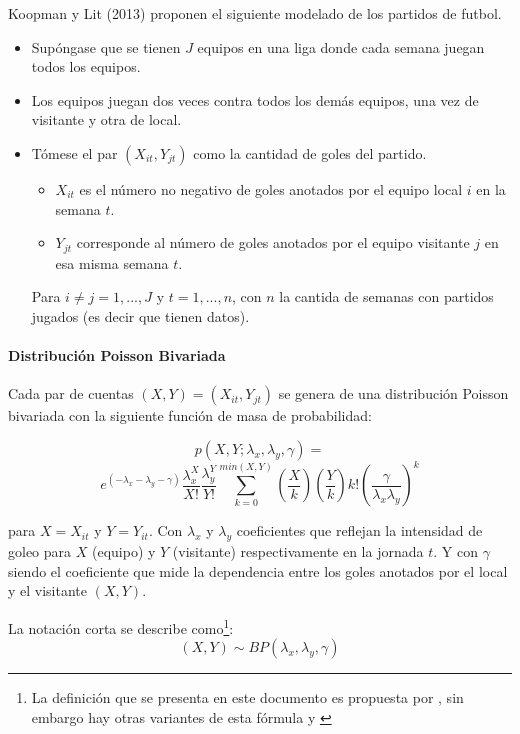 Koopman y Lit (2013) \cite{koopman2013dynamic} proponen el siguiente modelado de los partidos de futbol.
\begin{itemize}

	\item Supóngase que se tienen $J$ equipos en una liga donde cada semana juegan todos los equipos.

	\item Los equipos juegan dos veces contra todos los demás equipos, una vez de visitante y otra de local.
	\item Tómese el par $(X_{it},Y_{jt})$ como la cantidad de goles del partido. 
	\begin{itemize}
	
		\item $X_{it}$ es el número no negativo de goles anotados por el equipo local $i$ en la semana $t$.
		\item $Y_{jt}$ corresponde al número de goles anotados por el equipo visitante $j$ en esa misma semana $t$.
	\end{itemize}
		
		Para $i\neq j = 1, ...,J$ y $t=1,...,n$, con $n$ la cantida de semanas con partidos jugados (es decir que tienen datos).
\end{itemize}

\paragraph{Distribución Poisson Bivariada} %
\label{par:distribucion_poisson_bivariada}
Cada par de cuentas $(X,Y) = (X_{it},Y_{jt})$ se genera de una distribución Poisson bivariada con la siguiente función de masa de probabilidad:
 
 \[p(X,Y;\lambda_x,\lambda_y,\gamma) =\]
  \[e^{(-\lambda_x-\lambda_y-\gamma)}\frac{\lambda^X_x}{X!}\frac{\lambda^Y_y}{Y!}\sum_{k=0}^{min(X,Y)}\left(\frac{X}{k}\right)\left(\frac{Y}{k}\right)k!\left(\frac{\gamma}{\lambda_x\lambda_y}\right)^k \]

 para $X = X_{it}$ y $Y = Y_{it}$.
 Con $\lambda_x$ y $\lambda_y$ coeficientes que reflejan la intensidad de goleo para $X$ (equipo) y $Y$ (visitante) respectivamente en la jornada $t$.
 Y con $\gamma$ siendo el coeficiente que mide la dependencia entre los goles anotados por el local y el visitante $(X,Y)$. 

 La notación corta se describe como\footnote{La definición que se presenta en este documento es propuesta por \cite{koopman2013dynamic}, sin embargo hay otras variantes de esta fórmula \cite{kocherlakota1992bivariate} y \cite{johnson1997discrete}}:
 \boldmath\[(X,Y) \sim BP(\lambda_x,\lambda_y,\gamma)\]\unboldmath 
 

